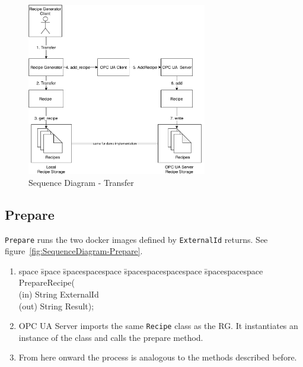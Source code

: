 \begin{figure}[ht]
	\centering
  \includegraphics[width=0.7\textwidth]{img/SequenceDiagram-Transfer.pdf}
	\caption{Sequence Diagram - Transfer}
	\label{fig:SequenceDiagram-Transfer}
\end{figure}

\subsection{Prepare}
\texttt{Prepare} runs the two docker images defined by \texttt{ExternalId} returns. See figure~\ref{fig:SequenceDiagram-Prepare}.

\begin{enumerate}
    \item 
    \begin{tabbing}
    space \= space \= spacespacespace \= spacespacespacespace \= spacespacespace \kill
    \>  PrepareRecipe(\\
    \>  \>  (in)	 \> 	String          \> ExternalId\\
    \>  \>  (out)	 \> 	String          \> Result); 
    \end{tabbing}
    \item OPC UA Server imports the same \texttt{Recipe} class as the RG. It instantiates an instance of the class and calls the prepare method.
    \item From here onward the process is analogous to the methods described before.
\end{enumerate}


